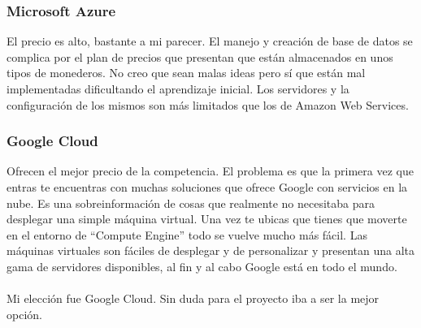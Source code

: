 \subsubsection{Microsoft Azure}
El precio es alto, bastante a mi parecer. El manejo y creación de base de datos se complica por el plan de precios que presentan que están almacenados en unos tipos de monederos. No creo que sean malas ideas pero sí que están mal implementadas dificultando el aprendizaje inicial. Los servidores y la configuración de los mismos son más limitados que los de Amazon Web Services.
\subsubsection{Google Cloud}
Ofrecen el mejor precio de la competencia. El problema es que la primera vez que entras te encuentras con muchas soluciones que ofrece Google con servicios en la nube. Es una sobreinformación de cosas que realmente no necesitaba para desplegar una simple máquina virtual. Una vez te ubicas que tienes que moverte en el entorno de ``Compute Engine'' todo se vuelve mucho más fácil. Las máquinas virtuales son fáciles de desplegar y de personalizar y presentan una alta gama de servidores disponibles, al fin y al cabo Google está en todo el mundo.
\\\\Mi elección fue Google Cloud. Sin duda para el proyecto iba a ser la mejor opción.